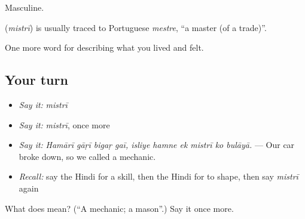 Masculine.

\begin{cousinweb}
\textbf{} (\emph{mistrī}) is usually traced to Portuguese \emph{mestre}, \textquotedblleft{}a master (of a trade)\textquotedblright{}.
\end{cousinweb}

\begin{grammarlens}[title={What you've built}]
One more word for describing what you lived and felt.
\end{grammarlens}

\subsection*{Your turn}
\begin{itemize}
\raggedright
  \item \emph{Say it:} \emph{mistrī}
  \item \emph{Say it:} \emph{mistrī}, once more
  \item \emph{Say it:} \emph{Hamārī gāṛī bigaṛ gaī, isliye hamne ek mistrī ko bulāyā.} — Our car broke down, so we called a mechanic.
  \item \emph{Recall:} say the Hindi for a skill, then the Hindi for to shape, then say \emph{mistrī} again
\end{itemize}

\begin{tcolorbox}[breakable,colback=teal!4,colframe=teal!35!black,title={Before you move on}]
What does  mean? (\textquotedblleft{}A mechanic; a mason\textquotedblright{}.) Say it once more.
\end{tcolorbox}
